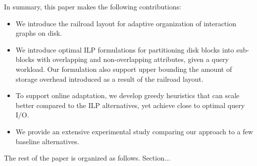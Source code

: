 In summary, this paper makes the following contributions:
\begin{itemize}
\item We introduce the railroad layout for adaptive organization of interaction
graphs on disk. 
\item We introduce optimal ILP formulations for partitioning disk blocks into 
sub-blocks with overlapping and non-overlapping attributes, given a query
workload. Our formulation also support upper bounding the amount of storage
overhead introduced as a result of the railroad layout.
\item To support online adaptation, we develop greedy heuristics that can scale
better compared to the ILP alternatives, yet achieve close to optimal query
I/O.
\item We provide an extensive experimental study comparing our approach to a
few baseline alternatives.
\end{itemize}

The rest of the paper is organized as follows. Section...




